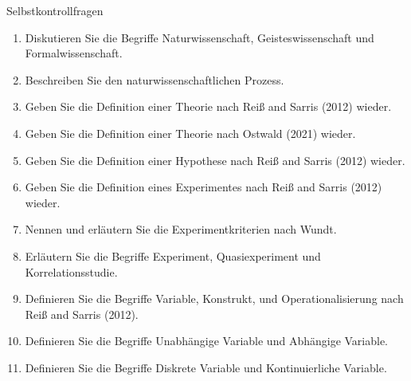 \documentclass[
  8pt,
  ignorenonframetext,
]{beamer}
\providecommand{\tightlist}{%
  \setlength{\itemsep}{0pt}\setlength{\parskip}{0pt}}
\begin{document}
\begin{frame}{Selbstkontrollfragen}
\protect\hypertarget{selbstkontrollfragen}{}
\footnotesize
{}

\begin{enumerate}
\tightlist
\item
  Diskutieren Sie die Begriffe Naturwissenschaft, Geisteswissenschaft
  und Formalwissenschaft.
\item
  Beschreiben Sie den naturwissenschaftlichen Prozess.
\item
  Geben Sie die Definition einer Theorie nach Reiß and Sarris (2012)
  wieder.
\item
  Geben Sie die Definition einer Theorie nach Ostwald (2021) wieder.
\item
  Geben Sie die Definition einer Hypothese nach Reiß and Sarris (2012)
  wieder.
\item
  Geben Sie die Definition eines Experimentes nach Reiß and Sarris
  (2012) wieder.
\item
  Nennen und erläutern Sie die Experimentkriterien nach Wundt.
\item
  Erläutern Sie die Begriffe Experiment, Quasiexperiment und
  Korrelationsstudie.
\item
  Definieren Sie die Begriffe Variable, Konstrukt, und
  Operationalisierung nach Reiß and Sarris (2012).
\item
  Definieren Sie die Begriffe Unabhängige Variable und Abhängige
  Variable.
\item
  Definieren Sie die Begriffe Diskrete Variable und Kontinuierliche
  Variable.
\end{enumerate}
\end{frame}
\end{document}
